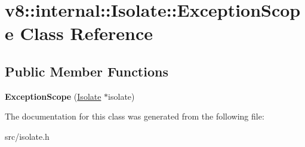 \hypertarget{classv8_1_1internal_1_1_isolate_1_1_exception_scope}{}\section{v8\+:\+:internal\+:\+:Isolate\+:\+:Exception\+Scope Class Reference}
\label{classv8_1_1internal_1_1_isolate_1_1_exception_scope}
\subsection*{Public Member Functions}
\begin{DoxyCompactItemize}
\item 
\hypertarget{classv8_1_1internal_1_1_isolate_1_1_exception_scope_a513f450377f5c44b9aa2c271ad3e4b3a}{}{\bfseries Exception\+Scope} (\hyperlink{classv8_1_1internal_1_1_isolate}{Isolate} $\ast$isolate)\label{classv8_1_1internal_1_1_isolate_1_1_exception_scope_a513f450377f5c44b9aa2c271ad3e4b3a}

\end{DoxyCompactItemize}


The documentation for this class was generated from the following file\+:\begin{DoxyCompactItemize}
\item 
src/isolate.\+h\end{DoxyCompactItemize}
